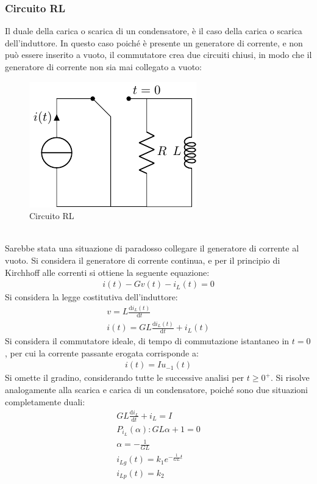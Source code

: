 \documentclass{article}
\newcommand{\df}{\mathrm{d}}
\numberwithin{equation}{subsection}
\begin{document}
\subsubsection{Circuito RL}
Il duale della carica o scarica di un condensatore, è il caso della carica o scarica dell'induttore. In questo caso poiché è presente un generatore di corrente, e non 
può essere inserito a vuoto, il commutatore crea due circuiti chiusi, in modo che il generatore di corrente non sia mai collegato a vuoto:
\begin{figure}[ht]%
    \centering
    \includegraphics{circuito-rl-tempo-continuo.pdf}
    \caption{Circuito RL}
    \label{fig:circuito-rl}
\end{figure}
\\
Sarebbe stata una situazione di paradosso collegare il generatore di corrente al vuoto. Si considera il generatore di corrente continua, e per il principio di Kirchhoff alle 
correnti si ottiene la seguente equazione:
\begin{gather*}
    i(t)-Gv(t)-i_L(t)=0
\end{gather*}
Si considera la legge costitutiva dell'induttore:
\begin{gather*}
    v=L\displaystyle\frac{\df i_L(t)}{\df t}\\
    i(t)=GL\displaystyle\frac{\df i_L(t)}{\df t}+i_L(t)
\end{gather*}
Si considera il commutatore ideale, di tempo di commutazione istantaneo in $t=0$, per cui la corrente passante erogata corrisponde a:
\begin{gather*}
    i(t)=Iu_{-1}(t)
\end{gather*}
Si omette il gradino, considerando tutte le successive analisi per $t\geq0^+$. Si risolve analogamente alla scarica e carica di un condensatore, poiché sono due situazioni 
completamente duali:
\begin{gather*}
    GL\displaystyle\frac{\df i_L}{\df t}+i_L=I\\
    P_{i_L}(\alpha):GL\alpha+1=0\\
    \alpha=\displaystyle-\frac{1}{GL}\\
    i_{Lg}(t)=k_1e^{-\frac{1}{GL}t}\\
    i_{Lp}(t)=k_2
\end{gather*}
\end{document}
